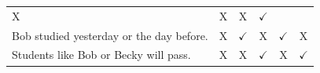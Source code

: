 \documentclass[oneside]{report}
\theoremstyle{definition}
\theoremstyle{definition}
\theoremstyle{definition}
\theoremstyle{remark}
\begin{document}
\begin{longtable}[]{@{}lccccc@{}}
\begin{minipage}[t]{0.05\columnwidth}
X\strut
\end{minipage} & \begin{minipage}[t]{0.05\columnwidth}\centering\strut
X\strut
\end{minipage} & \begin{minipage}[t]{0.09\columnwidth}\centering\strut
X\strut
\end{minipage} & \begin{minipage}[t]{0.12\columnwidth}\centering\strut
\(\checkmark\)\strut
\end{minipage}\tabularnewline
\begin{minipage}[t]{0.47\columnwidth}\raggedright\strut
Bob studied yesterday or the day before.\strut
\end{minipage} & \begin{minipage}[t]{0.05\columnwidth}\centering\strut
X\strut
\end{minipage} & \begin{minipage}[t]{0.05\columnwidth}\centering\strut
\(\checkmark\)\strut
\end{minipage} & \begin{minipage}[t]{0.05\columnwidth}\centering\strut
X\strut
\end{minipage} & \begin{minipage}[t]{0.09\columnwidth}\centering\strut
\(\checkmark\)\strut
\end{minipage} & \begin{minipage}[t]{0.12\columnwidth}\centering\strut
X\strut
\end{minipage}\tabularnewline
\begin{minipage}[t]{0.47\columnwidth}\raggedright\strut
Students like Bob or Becky will pass.\strut
\end{minipage} & \begin{minipage}[t]{0.05\columnwidth}\centering\strut
X\strut
\end{minipage} & \begin{minipage}[t]{0.05\columnwidth}\centering\strut
X\strut
\end{minipage} & \begin{minipage}[t]{0.05\columnwidth}\centering\strut
\(\checkmark\)\strut
\end{minipage} & \begin{minipage}[t]{0.09\columnwidth}\centering\strut
X\strut
\end{minipage} & \begin{minipage}[t]{0.12\columnwidth}\centering\strut
\(\checkmark\)\strut
\end{minipage}\tabularnewline

\end{longtable}
\end{document}
